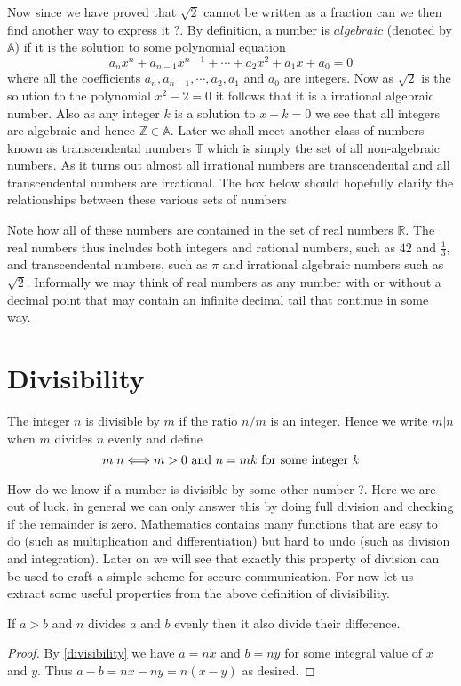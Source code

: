 \myindent Now since we have proved that $\sqrt{2}$ cannot be written as a fraction can we then find another way to express it ?. By definition, a number is $algebraic$ (denoted by $\mathbb{A}$) if it is the solution to some polynomial equation
\[
a_{n}x^{n} + a_{n-1}x^{n-1} + \cdots + a_{2}x^{2} + a_{1}x + a_0 = 0
\]
where all the coefficients $a_n, a_{n-1}, \cdots, a_2, a_1$ and $a_0$ are integers. Now as $\sqrt{2}$ is the solution to the polynomial $x^2 - 2 = 0$ it follows that it is a irrational algebraic number. Also as any integer $k$ is a solution to $x-k=0$ we see that all integers are algebraic and hence $\mathbb{Z} \in \mathbb{A}$. Later we shall meet another class of numbers known as transcendental numbers $\mathbb{T}$ which is simply the set of all non-algebraic numbers. As it turns  out almost all irrational numbers are transcendental and all transcendental numbers are irrational. The box below should hopefully clarify the relationships between these various sets of numbers
\begin{figure}[htb!]
\begin{center}
\end{center}
\end{figure}
Note how all of these numbers are contained in the set of real numbers $\mathbb{R}$. The real numbers thus includes both integers and rational numbers, such as $42$ and $\frac{1}{3}$, and transcendental numbers, such as $\pi$ and irrational algebraic numbers such as $\sqrt{2}$. Informally we may think of real numbers as any number with or without a decimal point that may contain an infinite decimal tail that continue in some way.

\section{Divisibility}
The integer $n$ is divisible by $m$ if the ratio $n/m$ is an integer. Hence we write $m|n$ when $m$ divides $n$ evenly and define
\begin{equation}\label{divisibility}
m|n \Longleftrightarrow m > 0 \textnormal{ and } n = mk
\textnormal{ for some integer } k
\end{equation}

How do we know if a number is divisible by some other number ?. Here we are out of luck, in general we can only answer this by doing full division and checking if the remainder is zero. Mathematics contains many functions that are easy to do (such as multiplication and differentiation) but hard to undo (such as division and integration). Later on we will see that exactly this property of division can be used to craft a simple scheme for secure communication. For now let us extract some useful properties from the above definition of divisibility.
\begin{proposition}
If $a > b$ and $n$ divides $a$ and $b$ evenly then it also divide their
difference.
\end{proposition}
\begin{proof}
By \ref{divisibility} we have $a = nx$ and  $b = ny$ for some integral value of $x$ and $y$. Thus $a-b = nx - ny = n(x-y)$ as desired.
\end{proof}

